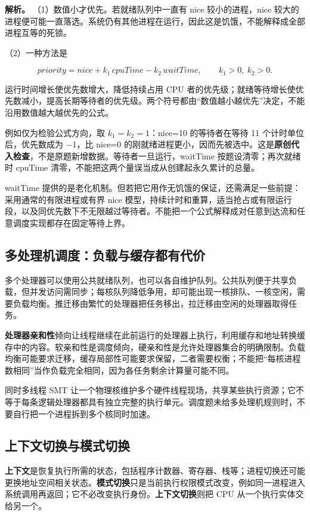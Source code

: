 \textbf{解析。} （1）数值小才优先。若就绪队列中一直有 nice 较小的进程，nice 较大的进程便可能一直落选。系统仍有其他进程在运行，因此这是饥饿，不能解释成全部进程互等的死锁。

（2）一种方法是

\[priority=nice+k_1\,cpuTime-k_2\,waitTime,\qquad k_1>0,\ k_2>0.\]

运行时间增长使优先数增大，降低持续占用 CPU 者的优先级；就绪等待增长使优先数减小，提高长期等待者的优先级。两个符号都由``数值越小越优先''决定，不能沿用数值越大越优先的公式。

例如仅为检验公式方向，取 \(k_1=k_2=1\)：nice=10 的等待者在等待 11 个计时单位后，优先数成为 \ensuremath{-}1，比 nice=0 的刚就绪进程更小，因而先被选中。这是\textbf{原创代入检查}，不是原题新增数据。等待者一旦运行，waitTime 按题设清零；再次就绪时 cpuTime 清零，不能把这两个量误当成从创建起永久累计的总量。

waitTime 提供的是老化机制。但若把它用作无饥饿的保证，还需满足一些前提：采用通常的有限进程或有界 nice 模型，持续计时和重算，适当抢占或有限运行段，以及同优先数下不无限越过等待者。不能把一个公式解释成对任意到达流和任意调度实现都存在固定等待上界。

\subsection{多处理机调度：负载与缓存都有代价}\label{OS02-2-9}

多个处理器可以使用公共就绪队列，也可以各自维护队列。公共队列便于共享负载，但并发访问需同步；每核队列降低争用，却可能出现一核排队、一核空闲，需要负载均衡。推迁移由繁忙的处理器把任务移出，拉迁移由空闲的处理器取得任务。

\textbf{处理器亲和性}倾向让线程继续在此前运行的处理器上执行，利用缓存和地址转换缓存中的内容。软亲和性是调度倾向，硬亲和性是允许处理器集合的明确限制。负载均衡可能要求迁移，缓存局部性可能要求保留，二者需要权衡；不能把``每核进程数相同''当作负载完全相同，因为各任务剩余计算量可能不同。

同时多线程 SMT 让一个物理核维护多个硬件线程现场，共享某些执行资源；它不等于每条逻辑处理器都具有独立完整的执行单元。调度题未给多处理机规则时，不要自行把一个进程拆到多个核同时加速。

\subsection{上下文切换与模式切换}\label{OS02-2-10}

\textbf{上下文}是恢复执行所需的状态，包括程序计数器、寄存器、栈等；进程切换还可能更换地址空间相关状态。\textbf{模式切换}只是当前执行权限模式改变，例如同一进程进入系统调用再返回；它不必改变执行身份。\textbf{上下文切换}则把 CPU 从一个执行实体交给另一个。

